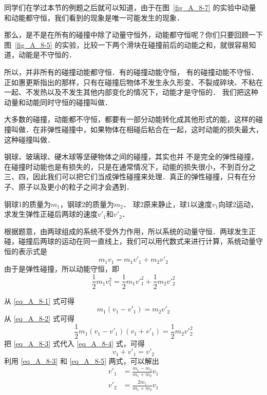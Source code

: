 同学们在学过本节的例题之后就可以知道，由于在图~\ref{fig_A_8-7} 的实验中动量和动能都守恒，我们看到的现象是唯一可能发生的现象．

那么，是不是在所有的碰撞中除了动量守恒外，动能都守恒呢？你们只要回顾一下图~\ref{fig_A_8-5} 的实验，比较一下两个滑块在碰撞前后的动能之和，就很容易知道，动能是不守恒的．

所以，并非所有的碰撞动能都守恒．有的碰撞动能守恒，
有的碰撞动能不守恒．
正如惠更斯指出的那样，只有在碰撞后物体不发生永久形变、不裂成碎块、不粘在一起、不发热以及不发生其他内部变化的情况下，动能才是守恒的．
我们把这种动量和动能同时守恒的碰撞叫做．

大多数的碰撞，动能都不守恒，都要有一部分动能转化成其他形式的能，这样的碰撞叫做．在非弹性碰撞中，如果物体在相碰后粘合在一起，这时动能的损失最大，这种碰撞叫做．

钢球、玻璃球、硬木球等坚硬物体之间的碰撞，其实也并
不是完全的弹性碰撞，在碰撞时动能也是有损失的，只是在通常情况下，动能的损失很小，不到百分之三、四，因此我们可以把它们当成弹性碰撞来处理．真正的弹性碰撞，只有在分子、原子以及更小的粒子之间才会遇到．


\begin{example}
    钢球1的质量为$m_1$，钢球2的质量为$m_2$．
    球2原来静止，球1以速度$v_1$向球2运动，求发生弹性正碰后两球的速度$v'_1$和$v'_2$．
\end{example}


\begin{solution}
    根据题意，由两球组成的系统不受外力作用，所以系统的动量守恒．两球发生正碰，碰撞后两球的运动在同一直线上，我们可以用代数式来进行计算，系统动量守恒的表示式是
\begin{equation}\label{eq_A_8-1}
    m_1v_1=m_1v'_1+m_2v'_2
\end{equation}
由于是弹性碰撞，所以动能守恒，即
\begin{equation}\label{eq_A_8-2}
    \frac{1}{2}m_1v_1^2=\frac{1}{2}m_1{v'}_1^2+\frac{1}{2}m_2{v'}_2^2
\end{equation}

从 \eqref{eq_A_8-1} 式可得
\begin{equation}\label{eq_A_8-3}
    m_1(v_1-v'_1)=m_2v'_2
\end{equation}
从 \eqref{eq_A_8-2} 式可得
\begin{equation}\label{eq_A_8-4}
    \frac{1}{2}m_1(v_1-v'_1)(v_1+v'_1)=\frac{1}{2}m_2{v'}_2^2
\end{equation}
把 \eqref{eq_A_8-3} 式代入 \eqref{eq_A_8-4} 式，可得
\begin{equation}\label{eq_A_8-5}
 v_1+v'_1=v'_2   
\end{equation}
利用 \eqref{eq_A_8-3} 和 \eqref{eq_A_8-5} 两式，可以解出
\begin{equation}\label{eq_A_8-6}
\begin{split}
    v'_1&=\frac{m_1-m_2}{m_1+m_2}v_1\\
    v'_2&=\frac{2m_1}{m_1+m_2}v_1\\
\end{split}
\end{equation}
\end{solution}

